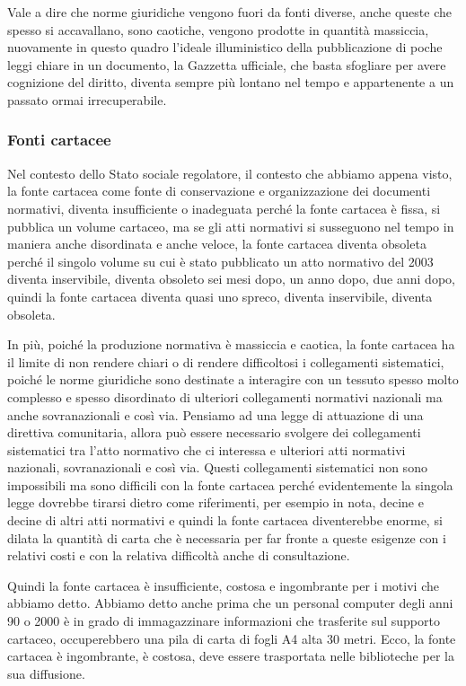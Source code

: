 Vale a dire che norme giuridiche vengono fuori da fonti diverse, anche queste che spesso si accavallano, sono caotiche, vengono prodotte in quantità massiccia, nuovamente in questo quadro l'ideale illuministico della pubblicazione di poche leggi chiare in un documento, la Gazzetta ufficiale, che basta sfogliare per avere cognizione del diritto, diventa sempre più lontano nel tempo e appartenente a un passato ormai irrecuperabile. 

\subsubsection{Fonti cartacee}
Nel contesto dello Stato sociale regolatore, il contesto che abbiamo appena visto, la fonte cartacea come fonte di conservazione e organizzazione dei documenti normativi, diventa insufficiente o inadeguata perché la fonte cartacea è fissa, si pubblica un volume cartaceo, ma se gli atti normativi si susseguono nel tempo in maniera anche disordinata e anche veloce, la fonte cartacea diventa obsoleta perché il singolo volume su cui è stato pubblicato un atto normativo del 2003 diventa inservibile, diventa obsoleto sei mesi dopo, un anno dopo, due anni dopo, quindi la fonte cartacea diventa quasi uno spreco, diventa inservibile, diventa obsoleta.

In più, poiché la produzione normativa è massiccia e caotica, la fonte cartacea ha il limite di non rendere chiari o di rendere difficoltosi i collegamenti sistematici, poiché le norme giuridiche sono destinate a interagire con un tessuto spesso molto complesso e spesso disordinato di ulteriori collegamenti normativi nazionali ma anche sovranazionali e così via. Pensiamo ad una legge di attuazione di una direttiva comunitaria, allora può essere necessario svolgere dei collegamenti sistematici tra l'atto normativo che ci interessa e ulteriori atti normativi nazionali, sovranazionali e così via. Questi collegamenti sistematici non sono impossibili ma sono difficili con la fonte cartacea perché evidentemente la singola legge dovrebbe tirarsi dietro come riferimenti, per esempio in nota, decine e decine di altri atti normativi e quindi la fonte cartacea diventerebbe enorme, si dilata la quantità di carta che è necessaria per far fronte a queste esigenze con i relativi costi e con la relativa difficoltà anche di consultazione. 

Quindi la fonte cartacea è insufficiente, costosa e ingombrante per i motivi che abbiamo detto. Abbiamo detto anche prima che un personal computer degli anni 90 o 2000 è in grado di immagazzinare informazioni che trasferite sul supporto cartaceo, occuperebbero una pila di carta di fogli A4 alta 30 metri. Ecco, la fonte cartacea è ingombrante, è costosa, deve essere trasportata nelle biblioteche per la sua diffusione. 


